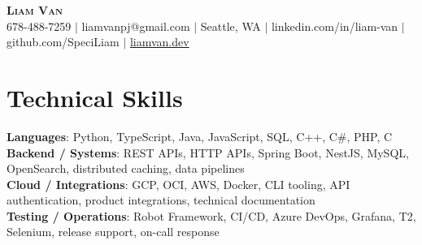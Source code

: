\documentclass[letterpaper,11pt]{article}
\begin{document}

%
\begin{center}
    \textbf{\Huge \scshape Liam Van} \\ \vspace{1pt}
    \small 678-488-7259 $|$ \small {liamvanpj@gmail.com} $|$ Seattle, WA
 {{$|$ linkedin.com/in/liam-van} {$|$ github.com/SpeciLiam} {$|$ \href{https://liamvan.dev}{liamvan.dev}}}

\end{center}

\section{Technical Skills}
 \begin{itemize}[leftmargin=0.15in, label={}]
    \small{\item{
     \textbf{Languages}{: Python, TypeScript, Java, JavaScript, SQL, C++, C\#, PHP, C} \\
     \textbf{Backend / Systems}{: REST APIs, HTTP APIs, Spring Boot, NestJS, MySQL, OpenSearch, distributed caching, data pipelines} \\
     \textbf{Cloud / Integrations}{: GCP, OCI, AWS, Docker, CLI tooling, API authentication, product integrations, technical documentation} \\
     \textbf{Testing / Operations}{: Robot Framework, CI/CD, Azure DevOps, Grafana, T2, Selenium, release support, on-call response} \\
    }}
 \end{itemize}
%
\end{document}
